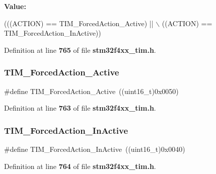 {\bfseries Value\+:}
\begin{DoxyCode}
(((ACTION) == TIM_ForcedAction_Active) || \(\backslash\)
                                      ((ACTION) == TIM_ForcedAction_InActive))
\end{DoxyCode}


Definition at line \textbf{ 765} of file \textbf{ stm32f4xx\+\_\+tim.\+h}.

\mbox{\label{group__TIM__Forced__Action_ga19d3769825f1dfdbdbde3edb60310b99}} 
\subsubsection{T\+I\+M\+\_\+\+Forced\+Action\+\_\+\+Active}
{\footnotesize\ttfamily \#define T\+I\+M\+\_\+\+Forced\+Action\+\_\+\+Active~((uint16\+\_\+t)0x0050)}



Definition at line \textbf{ 763} of file \textbf{ stm32f4xx\+\_\+tim.\+h}.

\mbox{\label{group__TIM__Forced__Action_ga79656f2193ec5e12a15d0ae5b025d273}} 
\subsubsection{T\+I\+M\+\_\+\+Forced\+Action\+\_\+\+In\+Active}
{\footnotesize\ttfamily \#define T\+I\+M\+\_\+\+Forced\+Action\+\_\+\+In\+Active~((uint16\+\_\+t)0x0040)}



Definition at line \textbf{ 764} of file \textbf{ stm32f4xx\+\_\+tim.\+h}.

